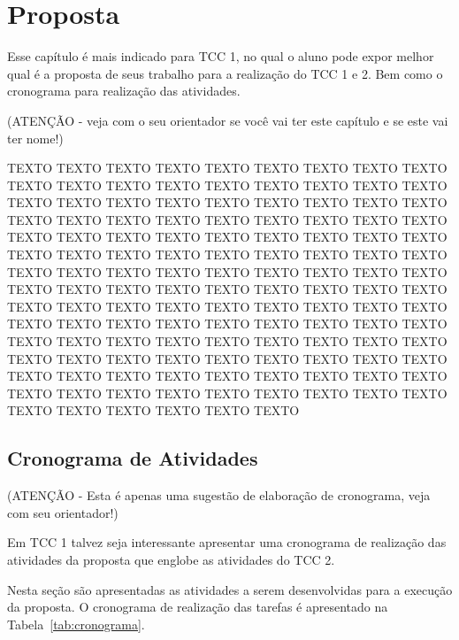 \chapter{Proposta}
\label{cap:proposta}

Esse capítulo é mais indicado para TCC 1, no qual o aluno pode expor melhor qual é a proposta de seus trabalho para a realização do TCC 1 e 2. Bem como o cronograma para realização das atividades.

(ATENÇÃO - veja com o seu orientador se você vai ter este capítulo e se este vai ter nome!)

TEXTO TEXTO TEXTO TEXTO TEXTO TEXTO TEXTO TEXTO TEXTO TEXTO TEXTO TEXTO TEXTO TEXTO TEXTO TEXTO TEXTO TEXTO TEXTO TEXTO TEXTO TEXTO TEXTO TEXTO TEXTO TEXTO TEXTO TEXTO TEXTO TEXTO TEXTO TEXTO TEXTO TEXTO TEXTO TEXTO TEXTO TEXTO TEXTO TEXTO TEXTO TEXTO TEXTO TEXTO TEXTO TEXTO TEXTO TEXTO TEXTO TEXTO TEXTO TEXTO TEXTO TEXTO TEXTO TEXTO TEXTO TEXTO TEXTO TEXTO TEXTO TEXTO TEXTO TEXTO TEXTO TEXTO TEXTO TEXTO TEXTO TEXTO TEXTO TEXTO TEXTO TEXTO TEXTO TEXTO TEXTO TEXTO TEXTO TEXTO TEXTO TEXTO TEXTO TEXTO TEXTO TEXTO TEXTO TEXTO TEXTO TEXTO TEXTO TEXTO TEXTO TEXTO TEXTO TEXTO TEXTO TEXTO TEXTO TEXTO TEXTO TEXTO TEXTO TEXTO TEXTO TEXTO TEXTO TEXTO TEXTO TEXTO TEXTO TEXTO TEXTO TEXTO TEXTO TEXTO TEXTO TEXTO TEXTO TEXTO TEXTO TEXTO TEXTO TEXTO TEXTO TEXTO TEXTO TEXTO TEXTO TEXTO TEXTO TEXTO

\section{Cronograma de Atividades}
\label{cap:proposta:sec:cronograma}

(ATENÇÃO - Esta é apenas uma sugestão de elaboração de cronograma, veja com seu orientador!)

Em TCC 1 talvez seja interessante apresentar uma cronograma de realização das atividades da proposta que englobe as atividades do TCC 2.

Nesta seção são apresentadas as atividades a serem desenvolvidas para a execução da proposta. O cronograma de realização das tarefas é apresentado na Tabela~\ref{tab:cronograma}.

